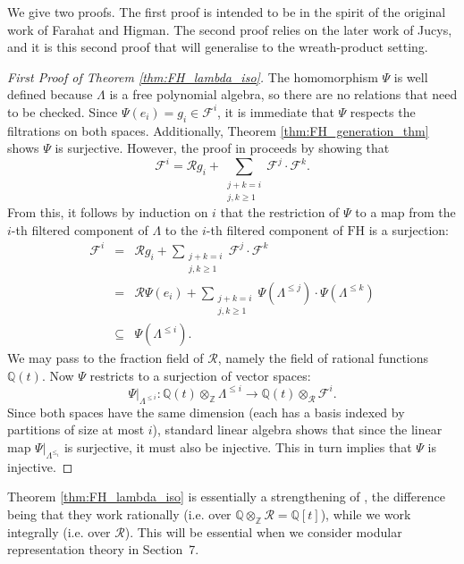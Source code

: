 \documentclass[10pt]{article}
\theoremstyle{definition}
\newcommand{\FH}{\mathrm{FH}}
\begin{document}
We give two proofs. The first proof is intended to be in the spirit of the original work of Farahat and Higman. The second proof relies on the later work of Jucys, and it is this second proof that will generalise to the wreath-product setting.
\begin{proof}[First Proof of Theorem \ref{thm:FH_lambda_iso}]
The homomorphism $\Psi$ is well defined because $\Lambda$ is a free polynomial algebra, so there are no relations that need to be checked. Since $\Psi(e_i) = g_i \in \mathcal{F}^i$, it is immediate that $\Psi$ respects the filtrations on both spaces. Additionally, Theorem \ref{thm:FH_generation_thm} shows $\Psi$ is surjective. However, the proof in \cite{FarahatHigman} proceeds by showing that \[
\mathcal{F}^i = \mathcal{R}g_i + \sum_{\substack{j+k = i \\ j,k \geq 1}}\mathcal{F}^j \cdot \mathcal{F}^k.
\]
From this, it follows by induction on $i$ that the restriction of $\Psi$ to a map from the $i$-th filtered component of $\Lambda$ to the $i$-th filtered component of $\FH$ is a surjection:
\begin{eqnarray*}
\mathcal{F}^i &=& \mathcal{R}g_i + \sum_{\substack{j+k = i \\ j,k \geq 1}}\mathcal{F}^j \cdot \mathcal{F}^k \\
&=& \mathcal{R}\Psi(e_i) + \sum_{\substack{j+k = i \\ j,k \geq 1}}\Psi(\Lambda^{\leq j}) \cdot \Psi(\Lambda^{\leq k}) \\
&\subseteq& \Psi(\Lambda^{\leq i}).
\end{eqnarray*}
We may pass to the fraction field of $\mathcal{R}$, namely the field of rational functions $\mathbb{Q}(t)$. Now $\Psi$ restricts to a surjection of vector spaces:
\[
\left.\Psi\right|_{\Lambda^{\leq i}}:
\mathbb{Q}(t) \otimes_{\mathbb{Z}} \Lambda^{\leq i} \to \mathbb{Q}(t) \otimes_{\mathcal{R}} \mathcal{F}^i.
\]
Since both spaces have the same dimension (each has a basis indexed by partitions of size at most $i$), standard linear algebra shows that since the linear map $\left.\Psi\right|_{\Lambda^{\leq_i}}$ is surjective, it must also be injective. This in turn implies that $\Psi$ is injective.
\end{proof}

Theorem \ref{thm:FH_lambda_iso} is essentially a strengthening of \cite[Theorem 3.1]{CorteelGoupilSchaeffer}, the difference being that they work rationally (i.e. over $\mathbb{Q} \otimes_{\mathbb{Z}} \mathcal{R} = \mathbb{Q}[t]$), while we work integrally (i.e. over $\mathcal{R}$). This will be essential when we consider modular representation theory in Section~\textup{7}.
\end{document}
